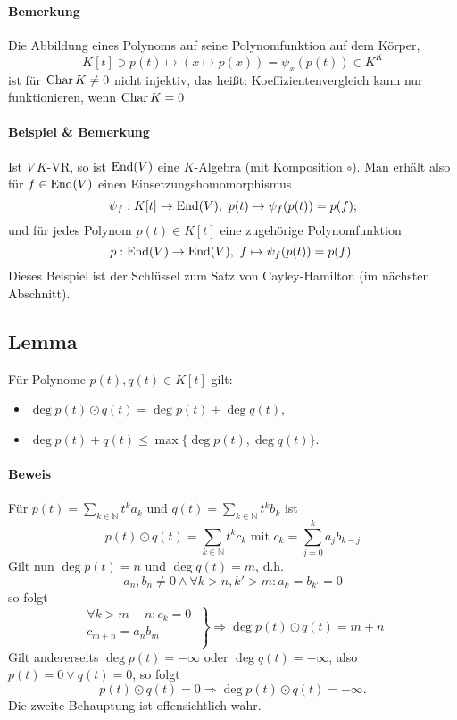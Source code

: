 \paragraph{Bemerkung}
	Die Abbildung eines Polynoms auf seine Polynomfunktion auf dem Körper,
		\[ K[t]\ni p(t)\mapsto (x\mapsto p(x))=\psi_x(p(t))\in K^K \]
	ist für $ \operatorname{Char} K\neq 0 $ nicht injektiv, das heißt: Koeffizientenvergleich kann nur funktionieren, wenn $ \operatorname{Char} K = 0 $
\paragraph{Beispiel \& Bemerkung}
	Ist $ V\ K $-VR, so ist $ \operatorname{End}(V) $ eine $ K $-Algebra (mit Komposition $ \circ $). Man erhält also für $ f\in \operatorname{End}(V) $ einen Einsetzungshomomorphismus
		\[ \psi_f: K[t]\to \operatorname{End}(V),\ p(t) \mapsto \psi_f(p(t)) = p(f); \]
	und für jedes Polynom $ p(t)\in K[t] $ eine zugehörige Polynomfunktion
		\[ p: \operatorname{End}(V)\to\operatorname{End}(V),\ f\mapsto \psi_f(p(t))= p(f). \]
	Dieses Beispiel ist der Schlüssel zum Satz von Cayley-Hamilton (im nächsten Abschnitt).
\subsection{Lemma}
	\begin{Lemma}
		Für Polynome $ p(t), q(t)\in K[t] $ gilt:
			\begin{itemize}
				\item $ \deg p(t)\odot q(t) = \deg p(t)+\deg q(t) $,
				\item $ \deg p(t)+q(t) \leq \max\{\deg p(t), \deg q(t)\} $.
			\end{itemize}
	\end{Lemma}
\paragraph{Beweis}
	Für $ p(t) = \sum_{k\in\mathbb{N}}t^ka_k $ und $ q(t) = \sum_{k\in\mathbb{N}}t^kb_k $ ist
		\[ p(t)\odot q(t) = \sum_{k\in\mathbb{N}}t^kc_k \text{ mit } c_k = \sum_{j=0}^{k}a_jb_{k-j} \]
	Gilt nun $ \deg p(t) = n $ und $ \deg q(t) = m $, d.h.
		\[ a_n,b_n \neq 0 \land \forall k>n, k'>m:a_k = b_{k'}=0 \] 
	so folgt
		\[ \left.
		\begin{aligned}
		\forall k>m+n : c_k = 0\ \\
		        c_{m+n} = a_nb_m\ \\
		\end{aligned}
		 \right\}
		\Rightarrow \deg p(t)\odot q(t) = m+n \]
	Gilt andererseits $ \deg p(t) = -\infty $ oder $ \deg q(t) = -\infty $, also $ p(t) = 0 \lor q(t) = 0 $,
	so folgt
		\[ p(t)\odot q(t) = 0 \Rightarrow \deg p(t)\odot q(t) = -\infty. \]
	Die zweite Behauptung ist offensichtlich wahr.
